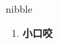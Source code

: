 
\begin{frame}
{\huge nibble}
\begin{center}
\begin{enumerate}\Large
  \item \textbf{小口咬}
\end{enumerate}
\end{center}
\end{frame}
